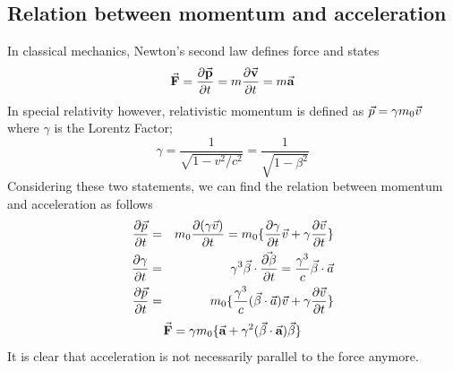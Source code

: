 \documentclass[a4paper,oneside,12pt]{report}
\numberwithin{equation}{chapter}
\begin{document}
\subsection{Relation between momentum and acceleration}
In classical mechanics, Newton's second law defines force and states 
\begin{equation} \label{eq:newton_second_law}
    \vec{\textbf{F}} = \frac{\partial \vec{\textbf{p}}}{\partial t} = m \frac{\partial \vec{\textbf{v}}}{\partial t} = m \vec{\textbf{a}}
\end{equation}
In special relativity however, relativistic momentum is defined as $\vec{p} = \gamma m_0 \vec{v} $ where $\gamma$ is the Lorentz Factor;
\begin{equation*}
    \gamma = \frac{1}{\sqrt{1-v^2 / c^2}} = \frac{1}{\sqrt{1-\beta^2}}
\end{equation*}
Considering these two statements, we can find the relation between momentum and acceleration as follows
\begin{eqnarray*}
    \frac{\partial \vec{p}}{\partial t} &=& m_0 \frac{\partial (\gamma \vec{v})}{\partial t} = m_0 \{  \frac{\partial \gamma}{\partial t}\vec{v} + \gamma \frac{\partial \vec{v}}{\partial t}  \} \\
    \frac{\partial \gamma}{\partial t} &=& \gamma^3 \vec{\beta} \cdot \vec{\frac{\partial \beta}{\partial t}} = \frac{\gamma^3}{c} \vec{\beta} \cdot \vec{a} \\
    \frac{\partial \vec{p}}{\partial t}  &=& m_0 \{   \frac{\gamma^3}{c} (\vec{\beta} \cdot \vec{a} )\vec{v} + \gamma \frac{\partial \vec{v}}{\partial t}  \} 
\end{eqnarray*}
\begin{equation} \label{eq:Frel}
    \vec{\textbf{F}}  = \gamma m_0 \{ \vec{\textbf{a}} + \gamma^2(\vec{\beta} \cdot \vec{\textbf{a}})\vec{\beta} \}
\end{equation}
It is clear that acceleration is not necessarily parallel to the force anymore. 
\end{document}
